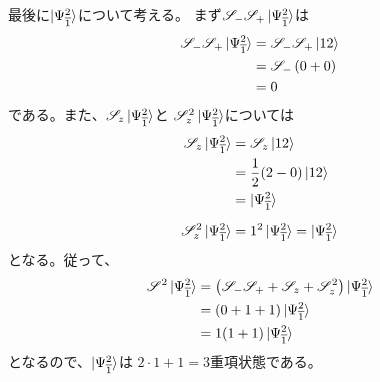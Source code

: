 最後に$\ket{\Psi_{{\overline{1}}}^{{2}}}$について考える。
まず$\mathscr{S}_- \mathscr{S}_+ \ket{\Psi_{{\overline{1}}}^{{2}}}$は
\begin{align}
	\mathscr{S}_- \mathscr{S}_+ \ket{\Psi_{\borb{1}}^{\aorb{2}}}
&=
	\mathscr{S}_- \mathscr{S}_+ \ket{\aorb{1}\aorb{2}} \\
%
%
&=
	\mathscr{S}_-\left(
		0 +0
	\right) \\
%
%
&=
	0
\end{align}
である。また、$\mathscr{S}_z \ket{\Psi_{{\overline{1}}}^{{2}}}$と
$\mathscr{S}_z^2 \ket{\Psi_{{\overline{1}}}^{{2}}}$については
\begin{align}
	\mathscr{S}_z \ket{\Psi_{\borb{1}}^{\aorb{2}}}
&=
	\mathscr{S}_z \ket{\aorb{1}\aorb{2}} \\
%
%
&=
	\frac{1}{2} (2-0) \ket{\aorb{1}\aorb{2}} \\
%
%
&=
	\ket{\Psi_{\borb{1}}^{\aorb{2}}} \\[2mm]
%
%
	\mathscr{S}_z^2 \ket{\Psi_{\borb{1}}^{\aorb{2}}}
&=
	1^2 \ket{\Psi_{\borb{1}}^{\aorb{2}}}
=
	\ket{\Psi_{\borb{1}}^{\aorb{2}}}
\end{align}
となる。従って、
\begin{align}
	\mathscr{S}^2 \ket{\Psi_{\borb{1}}^{\aorb{2}}}
&=
	\left(
		\mathscr{S}_- \mathscr{S}_+
		+
		\mathscr{S}_z
		+
		\mathscr{S}_z^2
	\right) \ket{\Psi_{\borb{1}}^{\aorb{2}}} \\
%
%
&=
	(0+1+1) \ket{\Psi_{\borb{1}}^{\aorb{2}}} \\
%
%
&=
	1 (1+1) \ket{\Psi_{\borb{1}}^{\aorb{2}}}
\end{align}
となるので、$\ket{\Psi_{{\overline{1}}}^{{2}}}$は
$2\cdot 1+1=3$重項状態である。

